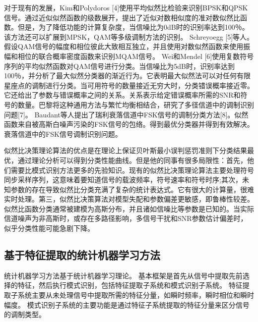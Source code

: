 对于现有的发展，Kim和Polydoros [4]使用平均似然比检验来识别BPSK和QPSK信号。通过近似似然函数的级数展开，提出了近似对数相似度的准对数似然比函数。但是，为了降低功能的计算复杂度，当信噪比为0dB时的识别率达到100％。该方法还可以扩展到MPSK，QAM等多级调制方法的识别。 Schreyoegg [5]等人。假设QAM信号的幅度和相位彼此大致相互独立，并且使用对数似然函数来使用振幅和相位的联合概率密度函数来识别MQAM信号。 Wei和Mendel [6]使用复数符号序列的平均似然函数对QAM信号进行分类。当信噪比为5dB时，识别率达到100％，并分析了最大似然分类器的渐近行为。它表明最大似然法可以对任何有限星座点的调制进行分类。当可用符号的数量接近无穷大时，分类错误概率接近零。它还给出了参数与错误概率之间的关系。关系表示给定错误概率所需的SNR和符号的数量。巴黎将这种通用方法与繁忙均衡相结合，研究了多径信道中的调制识别问题[7]。 Baudant等人提出了瑞利衰落信道中FSK信号的调制分类方法[8]。似然函数来自被高斯白噪声污染的FSK信号的包络。得到最优分类器并得到有效解决。衰落信道中的FSK信号调制识别问题。\par
 
似然比决策理论算法的优点是在理论上保证贝叶斯最小误判惩罚准则下分类结果最优，通过理论分析可以得到分类性能曲线。但是他的同事有很多局限性：首先，他们需要比模式识别方法更多的先验知识。现有的似然比决策理论算法主要处理符号同步采样序列，这意味着要知道信号的载波频率，符号速率和符号时序;其次，未知参数的存在导致似然比分类充满了复杂的统计表达式。它有很大的计算量，很难实时处理。第三，似然比决策算法对模型失配和参数偏差更敏感，即鲁棒性较差。似然比函数分类通常被建模为高斯分布，并且诸如信噪比等参数是已知的。当实际信道噪声为非高斯时，或存在多路径影响，多信号干扰和SNR参数估计偏差时，似乎分类性能可能急剧下降。\par
 
\subsection{基于特征提取的统计机器学习方法}

统计机器学习方法基于统计机器学习理论。 基本框架是首先从信号中提取先前选择的特征，然后执行模式识别，包括特征提取子系统和模式识别子系统。 特征提取子系统主要从未处理信号中提取所需的特征分量，如瞬时频率，瞬时相位和瞬时幅度。 模式识别子系统的主要功能是通过特征子系统提取的特征分量来区分信号的调制类型。 \par

